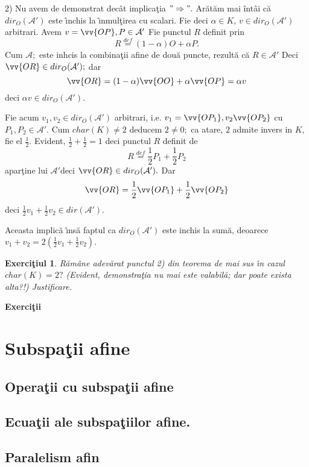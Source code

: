 \documentclass[12pt]{book}
\def\Ac{\mathcal A}
\def\defq{\stackrel{def}{=}}
\newtheorem{exe}{Exerci\c tiul }
\begin{document}
2) Nu avem de demonstrat dec\^at implica\c tia $"\Rightarrow".$ Ar\u at\u am mai \^int\^ai c\u a $dir_O(\Ac')$ este \^{\i}nchis la \^{\i}nmul\c tirea cu scalari. Fie deci $\alpha\in K$, $v\in dir_O(\Ac')$ arbitrari.
Avem $v=\vv{OP}, P\in \Ac'$ Fie punctul $R$ definit prin
$$R\defq(1-\alpha)O+\alpha P.$$
Cum $\Ac;$ este inhcis la combina\c tii afine de dou\u a puncte, rezult\u a c\u a  $R\in \Ac'$ Deci $\vv{OR}\in dir_O(\Ac');$ dar
$$\vv{OR}=(1-\alpha)\vv{OO}+\alpha \vv{OP}=\alpha v$$
deci $\alpha v\in dir_O(\Ac').$

Fie acum $v_1, v_2\in dir_O(\Ac')$ arbitrari, i.e. $v_1=\vv{OP_1}, v_2\vv{OP_2}$ cu $P_1, P_2\in \Ac'.$
Cum $char(K)\not=2$ deducem $2\not=0;$ ca atare, $2$ admite invers in $K,$ fie el $\frac{1}{2}.$
Evident, $\frac{1}{2}+\frac{1}{2}=1$ deci punctul $R$ definit de
$$R\defq \frac{1}{2}P_1+\frac{1}{2}P_2$$ 
apar\c tine lui $\Ac'$deci $\vv{OR}\in dir_O(\Ac').$
Dar
$$\vv{OR}=\frac{1}{2}\vv{OP_1}+\frac{1}{2}\vv{OP_2}$$
deci $\frac{1}{2}{v_1}+\frac{1}{2}v_2\in dir(\Ac').$

Aceasta implic\u a \^{\i}ns\u a faptul ca $dir_O(\Ac')$ este inchis la sum\u a, deoarece
$v_1+v_2=2(\frac{1}{2}v_1+\frac{1}{2}v_2).$


\begin{exe}
R\u am\^ane adev\u arat punctul 2) din teorema de mai sus \^{\i}n cazul $char(K)=2?$ (Evident, demonstra\c tia nu mai este valabil\u a; dar poate exista alta?!) Justificare.
\end{exe}
\begin{center} {\bf Exerci\c tii}
\end{center}

\newpage

\section{Subspa\c tii afine}
\subsection{Opera\c tii cu subspa\c tii afine}
\subsection{Ecua\c tii ale subspa\c tiilor afine.}
\subsection{Paralelism afin}
\end{document}
